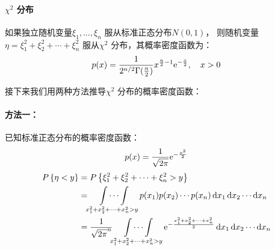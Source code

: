 \paragraph{\(\chi^{2}\) 分布}
如果独立随机变量\(\xi_{1}, \dots ,\xi_{n}\) 服从标准正态分布\(N(0,1)\)，
则随机变量\(\eta = \xi_{1}^{2} + \xi_{2}^{2} + \cdots +
\xi_{n}^{2}\) 服从\(\chi^{2}\) 分布，其概率密度函数为：
\[
    p(x) = \frac{1}{2^{n/2} \Gamma(\frac{n}{2})} x^{\frac{n}{2}-1}
    \mathrm{e}^{-\frac{x}{2}}, \quad x>0
\]

接下来我们用两种方法推导\(\chi^{2}\) 分布的概率密度函数：
\paragraph{方法一：}
已知标准正态分布的概率密度函数：\[
    p(x) = \frac{1}{\sqrt{2\pi}} \mathrm{e}^{-\frac{x^{2}}{2}}
\]
\begin{align*}
    \P{\eta<y} &= \P{\xi_{1}^{2} + \xi_{2}^{2} + \cdots +
    \xi_{n}^{2} > y} \\
    &= \idotsint\limits_{x_{1}^{2} + x_{2}^{2} + \cdots +
    x_{n}^{2} > y} p(x_{1}) p(x_{2}) \cdots p(x_{n}) \d{x}_{1}
    \d{x}_{2} \cdots \d{x}_{n} \\
    &= \frac{1}{\sqrt{2\pi}^{n}}
    \idotsint\limits_{x_{1}^{2} + x_{2}^{2} + \cdots + x_{n}^{2} > y}
    \e^{-\frac{x_{1}^{2}+ x_{2}^{2} +\dots + x_{n}^{2}}{2}}
    \d{x}_{1} \d{x}_{2} \cdots \d{x}_{n} \\
\end{align*}

